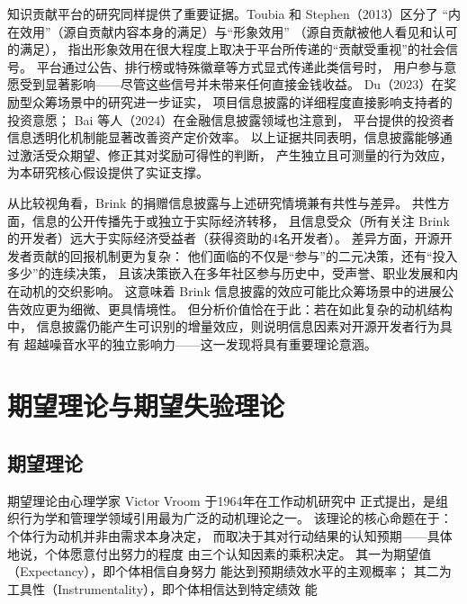 知识贡献平台的研究同样提供了重要证据。Toubia 和 Stephen（2013）区分了
“内在效用”（源自贡献内容本身的满足）与“形象效用”
（源自贡献被他人看见和认可的满足），
指出形象效用在很大程度上取决于平台所传递的“贡献受重视”的社会信号\cite{toubia2013intrinsic}。
平台通过公告、排行榜或特殊徽章等方式显式传递此类信号时，
用户参与意愿受到显著影响——尽管这些信号并未带来任何直接金钱收益。
Du（2023）在奖励型众筹场景中的研究进一步证实，
项目信息披露的详细程度直接影响支持者的投资意愿\cite{du2023impact}；
Bai 等人（2024）在金融信息披露领域也注意到，
平台提供的投资者信息透明化机制能显著改善资产定价效率\cite{bai2024platform}。
以上证据共同表明，信息披露能够通过激活受众期望、修正其对奖励可得性的判断，
产生独立且可测量的行为效应，为本研究核心假设提供了实证支撑。

从比较视角看，Brink 的捐赠信息披露与上述研究情境兼有共性与差异。
共性方面，信息的公开传播先于或独立于实际经济转移，
且信息受众（所有关注 Brink 的开发者）远大于实际经济受益者（获得资助的4名开发者）。
差异方面，开源开发者贡献的回报机制更为复杂：
他们面临的不仅是“参与”的二元决策，还有“投入多少”的连续决策，
且该决策嵌入在多年社区参与历史中，受声誉、职业发展和内在动机的交织影响。
这意味着 Brink 信息披露的效应可能比众筹场景中的进展公告效应更为细微、更具情境性。
但分析价值恰在于此：若在如此复杂的动机结构中，
信息披露仍能产生可识别的增量效应，则说明信息因素对开源开发者行为具有
超越噪音水平的独立影响力——这一发现将具有重要理论意涵。

\section{期望理论与期望失验理论}

\subsection{期望理论}

期望理论由心理学家 Victor Vroom 于1964年在工作动机研究中
正式提出\cite{vroom1964work}，是组织行为学和管理学领域引用最为广泛的动机理论之一。
该理论的核心命题在于：个体行为动机并非由需求本身决定，
而取决于其对行动结果的认知预期——具体地说，个体愿意付出努力的程度
由三个认知因素的乘积决定。
其一为期望值（Expectancy），即个体相信自身努力
能达到预期绩效水平的主观概率；
其二为工具性（Instrumentality），即个体相信达到特定绩效
能